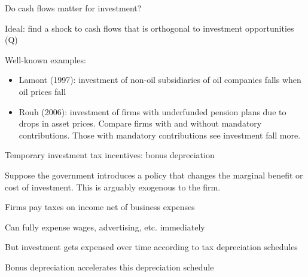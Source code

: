 \documentclass[11pt, aspectratio=169]{beamer}
\newenvironment{witemize}{\itemize\addtolength{\itemsep}{10pt}}{\enditemize}
\begin{document}
\begin{frame}{Do cash flows matter for investment?}
\begin{witemize}
\item Ideal: find a shock to cash flows that is orthogonal to investment opportunities (Q)

\item Well-known examples:
\begin{itemize}
	\item Lamont (1997): investment of non-oil subsidiaries of oil companies falls when oil prices fall

	\item Rouh (2006): investment of firms with underfunded pension plans due to drops in asset prices. Compare firms with and without mandatory contributions. Those with mandatory contributions see investment fall more.
\end{itemize}


\end{witemize}
\end{frame}


\begin{frame}{Temporary investment tax incentives: bonus depreciation}
\begin{witemize}
\item Suppose the government introduces a policy that changes the marginal benefit or cost of investment. This is arguably exogenous to the firm.

\item Firms pay taxes on income net of business expenses

\item Can fully expense wages, advertising, etc. immediately 

\item But investment gets expensed over time according to tax depreciation schedules

\item Bonus depreciation accelerates this depreciation schedule
\end{witemize}
\end{frame}
\end{document}
